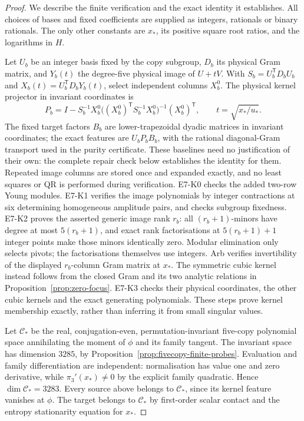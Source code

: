 \begin{proof}
We describe the finite verification and the exact identity it establishes.
All choices of bases and fixed coefficients are supplied as integers,
rationals or binary rationals. The only other constants are $x_*$,
its positive square root ratios, and the logarithms in $H$.

Let $U_b$ be an integer basis fixed by the copy subgroup, $D_b$ its
physical Gram matrix, and $Y_b(t)$ the degree-five physical image of
$U+tV$. With $S_b=U_b^{\mathsf T}D_bU_b$ and
$X_b(t)=U_b^{\mathsf T}D_bY_b(t)$, select independent columns $X_b^0$.
The physical kernel projector in invariant coordinates is
\begin{equation}\label{eq:seven-entropy-kernel-projector}
 P_b=I-S_b^{-1}X_b^0
       \bigl((X_b^0)^{\mathsf T}S_b^{-1}X_b^0\bigr)^{-1}
       (X_b^0)^{\mathsf T},\qquad
 t=\sqrt{x_*/u_*}.
\end{equation}
The fixed target factors $B_b$ are lower-trapezoidal dyadic matrices
in invariant coordinates; the exact features are $U_bP_bB_b$, with the
rational diagonal-Gram transport used in the purity certificate.
These baselines need no justification of their own: the complete repair
check below establishes the identity for them. Repeated image columns are
stored once and expanded exactly, and no least squares or QR is performed
during verification.
E7-K0 checks the added two-row Young modules. E7-K1 verifies the image polynomials by
integer contractions at six determining homogeneous amplitude pairs,
and checks subgroup fixedness. E7-K2 proves the asserted generic image
rank $r_b$: all $(r_b+1)$-minors have degree at most $5(r_b+1)$,
and exact rank factorisations at $5(r_b+1)+1$ integer points make those
minors identically zero. Modular elimination only selects pivots;
the factorisations themselves use integers. Arb verifies invertibility
of the displayed $r_b$-column Gram matrix at $x_*$. The symmetric cubic
kernel instead follows from the closed Gram and its two analytic
relations in Proposition~\ref{prop:zero-focus}. E7-K3 checks their
physical coordinates, the other cubic kernels and the exact generating
polynomials. These steps prove
kernel membership exactly, rather than inferring it from small singular values.

Let $\mathcal C_*$ be the real, conjugation-even, permutation-invariant
five-copy polynomial space annihilating the moment of $\phi$ and its
family tangent. The invariant space has dimension $3285$, by
Proposition~\ref{prop:fivecopy-finite-probes}. Evaluation and family
differentiation are independent: normalisation has value one and zero
derivative, while $\pi_3'(x_*)\ne0$ by the explicit family quadratic.
Hence $\dim\mathcal C_*=3283$. Every source above belongs to
$\mathcal C_*$, since its kernel feature vanishes at $\phi$.
The target belongs to $\mathcal C_*$ by first-order scalar contact and
the entropy stationarity equation for $x_*$.


\end{proof}
